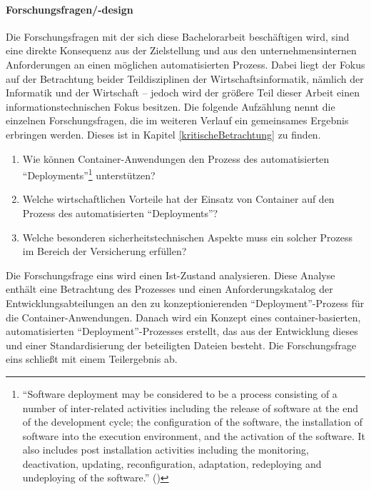 \paragraph{Forschungsfragen/-design}
Die Forschungsfragen mit der sich diese Bachelorarbeit beschäftigen wird, sind eine direkte Konsequenz aus der Zielstellung und aus den unternehmensinternen Anforderungen an einen möglichen automatisierten Prozess. Dabei liegt der Fokus auf der Betrachtung beider Teildisziplinen der Wirtschaftsinformatik, nämlich der Informatik und der Wirtschaft -- jedoch wird der größere Teil dieser Arbeit einen informationstechnischen Fokus besitzen. Die folgende Aufzählung nennt die einzelnen Forschungsfragen, die im weiteren Verlauf ein gemeinsames Ergebnis erbringen werden. Dieses ist in Kapitel \vref{kritischeBetrachtung} zu finden.
\begin{enumerate}
	\item Wie können Container-Anwendungen den Prozess des automatisierten \enquote{Deployments}\footnote{\enquote{Software deployment may be considered to be a process consisting of a number of inter-related activities including the release of software at the end of the development cycle; the configuration of the software, the installation of software into the execution environment, and the activation of the software. It also includes post installation activities including the monitoring, deactivation, updating, reconfiguration, adaptation, redeploying and undeploying of the software.} (\cite{dearle_software_2007})} unterstützen?
	\item Welche wirtschaftlichen Vorteile hat der Einsatz von Container auf den Prozess des automatisierten \enquote{Deployments}?
	\item Welche besonderen sicherheitstechnischen Aspekte muss ein solcher Prozess im Bereich der Versicherung erfüllen?
\end{enumerate}
Die Forschungsfrage eins wird einen Ist-Zustand analysieren. Diese Analyse enthält eine Betrachtung des Prozesses und einen Anforderungskatalog der Entwicklungsabteilungen an den zu konzeptionierenden \enquote{Deployment}-Prozess für die Container-Anwendungen. Danach wird ein Konzept eines container-basierten, automatisierten \enquote{Deployment}-Prozesses erstellt, das aus der Entwicklung dieses und einer Standardisierung der beteiligten Dateien besteht. Die Forschungsfrage eins schließt mit einem Teilergebnis ab. \par

